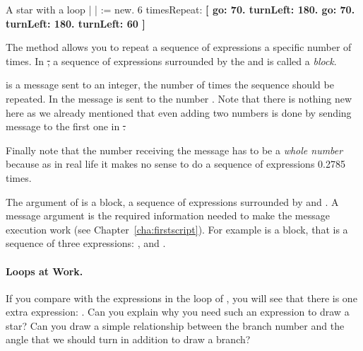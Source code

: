 \begin{scriptwithtitle}{A star with a loop}\label{scr:starloop}
| \caro |
\caro := \Turtle new.
6 timesRepeat: 
     \textbf{\textbf{[} \caro go: 70.
     \caro turnLeft: 180.
     \caro go: 70.
     \caro turnLeft: 180.
     \caro turnLeft: 60 \textbf{]}}
\end{scriptwithtitle} 


The method \timesRepeat allows you to repeat a sequence of expressions a specific number of times. In \st, a sequence of expressions surrounded by the \ct{[} and \ct{]} is called a \emph{block}. 

\timesRepeat is a message  sent to an integer, the number of times the sequence should be repeated. In  the message \timesRepeat \ct{[...]} is sent to the number . Note that there is nothing new here as we already mentioned that even adding two numbers is done by sending message to the first one in \st. 

Finally note that the number receiving the message \timesRepeat has to be  a \emph{whole number}  because as in real life it makes no sense to do a sequence of 
expressions 0.2785 times.

The argument of \timesRepeat is a block, \ie a sequence of expressions surrounded by \ct{[} and \ct{]}. A message argument is the required information needed to make the message execution work (see Chapter~\ref{cha:firstscript}). For example  is a block, that is a sequence of three expressions: , 
      and  .



\paragraph{Loops at Work.} If you compare  with the expressions in the loop of , you will see that there is one extra expression: . Can you explain why you need such an expression to draw a star? Can you draw a simple relationship between the branch number and the angle that we should turn in addition to draw a branch? 

